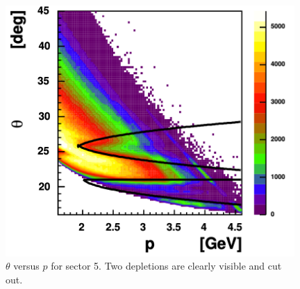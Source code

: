 \begin{figure}[h]
 \begin{center}
 \includegraphics[width=0.98\textwidth ]{img/electron_tp5}
  \caption[ $\theta$ versus $p$ for sector 5]
          { $\theta$ versus $p$ for sector 5. Two depletions are clearly visible and cut out.}
 \label{fig:fidu_etp5}
 \end{center}
\end{figure}


